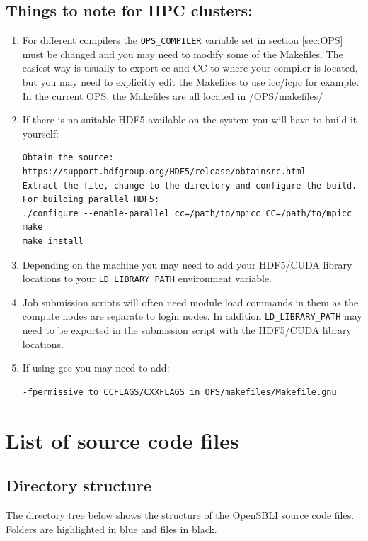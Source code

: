 \documentclass[11pt]{article}
\begin{document}
\subsection{Things to note for HPC clusters:}
\begin{enumerate}
\item{For different compilers the \verb|OPS_COMPILER| variable set in section \ref{sec:OPS} must be changed and you may need to modify some of the Makefiles. The easiest way is usually to export cc and CC to where your compiler is located, but you may need to explicitly edit the Makefiles to use icc/icpc for example. In the current OPS, the Makefiles are all located in /OPS/makefiles/}

\item{If there is no suitable HDF5 available on the system you will have to build it yourself:}
\begin{verbatim}
Obtain the source: https://support.hdfgroup.org/HDF5/release/obtainsrc.html
Extract the file, change to the directory and configure the build.
For building parallel HDF5:
./configure --enable-parallel cc=/path/to/mpicc CC=/path/to/mpicc
make
make install
\end{verbatim} 

\item{Depending on the machine you may need to add your HDF5/CUDA library locations to your \verb|LD_LIBRARY_PATH| environment variable.}

\item{Job submission scripts will often need module load commands in them as the compute nodes are separate to login nodes. In addition \verb|LD_LIBRARY_PATH| may need to be exported in the submission script with the HDF5/CUDA library locations.}

\item{If using gcc you may need to add:}
\begin{verbatim}
-fpermissive to CCFLAGS/CXXFLAGS in OPS/makefiles/Makefile.gnu
\end{verbatim}

\end{enumerate}

\newpage
\section{List of source code files}
\subsection{Directory structure}
The directory tree below shows the structure of the OpenSBLI source code files. Folders are highlighted in blue and files in black.
\end{document}
